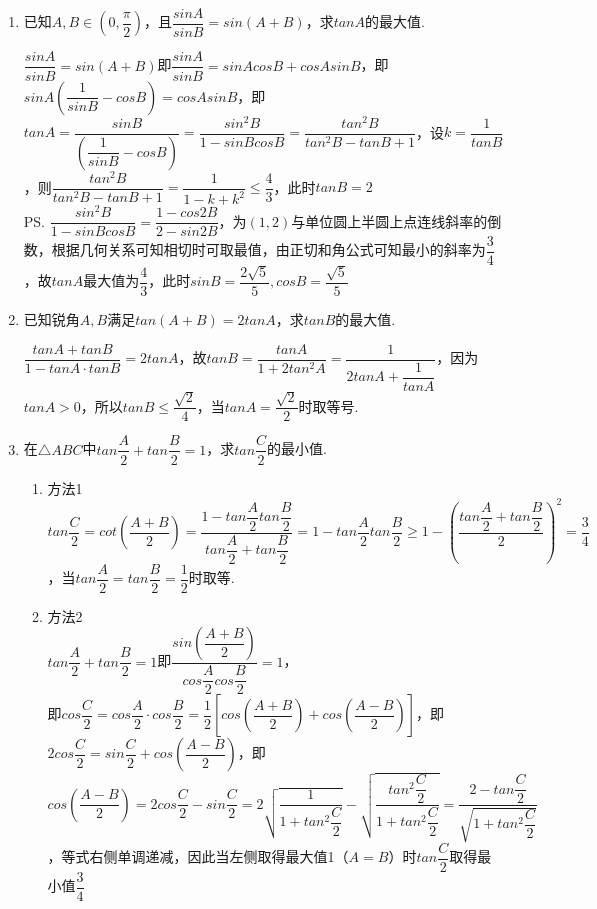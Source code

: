 \begin{enumerate}
    \item 已知$A, B \in \left(0, \dfrac{\pi}{2}\right)$，且$\dfrac{sinA}{sinB} = sin(A+B)$，求$tanA$的最大值.
    \begin{jieda}
        $\dfrac{sinA}{sinB} = sin(A+B)$即$\dfrac{sinA}{sinB} = sinAcosB+cosAsinB$，即$sinA\left(\dfrac{1}{sinB} - cosB\right) = cosAsinB$，即$tanA = \dfrac{sinB}{\left(\dfrac{1}{sinB} - cosB\right)} = \dfrac{sin^2B}{1 - sinBcosB} = \dfrac{tan^2B}{tan^2B - tanB + 1}$，设$k = \dfrac{1}{tanB}$，则$\dfrac{tan^2B}{tan^2B - tanB + 1} = \dfrac{1}{1 - k + k^2} \leq \dfrac{4}{3}$，此时$tanB = 2$ \\
        \ps $\dfrac{sin^2B}{1 - sinBcosB} = \dfrac{1-cos2B}{2-sin2B}$，为$(1, 2)$与单位圆上半圆上点连线斜率的倒数，根据几何关系可知相切时可取最值，由正切和角公式可知最小的斜率为$\dfrac{3}{4}$，故$tanA$最大值为$\dfrac{4}{3}$，此时$sinB = \dfrac{2\sqrt{5}}{5}, cosB = \dfrac{\sqrt{5}}{5}$
    \end{jieda}
    \item 已知锐角$A, B$满足$tan(A+B) = 2tanA$，求$tanB$的最大值.
    \begin{jieda}
        $\dfrac{tanA + tanB}{1-tanA \cdot tanB} = 2tanA$，故$tanB = \dfrac{tanA}{1+2tan^2A} = \dfrac{1}{2tanA + \dfrac{1}{tanA}}$，因为$tanA > 0$，所以$tanB \leq \dfrac{\sqrt{2}}{4}$，当$tanA = \dfrac{\sqrt{2}}{2}$时取等号.
    \end{jieda}
    \item 在$\triangle ABC$中$tan\dfrac{A}{2} + tan\dfrac{B}{2} = 1$，求$tan\dfrac{C}{2}$的最小值.
    \begin{jieda}
        \begin{enumerate}
            \item 方法1 \\
            $tan\dfrac{C}{2} = cot\left(\dfrac{A+B}{2}\right) = \dfrac{1-tan\dfrac{A}{2}tan\dfrac{B}{2}}{tan\dfrac{A}{2}+tan\dfrac{B}{2}} = 1-tan\dfrac{A}{2}tan\dfrac{B}{2} \geq 1 - \left(\dfrac{tan\dfrac{A}{2} + tan\dfrac{B}{2}}{2}\right)^2 = \dfrac{3}{4}$，当$tan\dfrac{A}{2} = tan\dfrac{B}{2} = \dfrac{1}{2}$时取等.
            \item 方法2 \\
            $tan\dfrac{A}{2} + tan\dfrac{B}{2} = 1$即$\dfrac{sin\left(\dfrac{A+B}{2}\right)}{cos\dfrac{A}{2}cos\dfrac{B}{2}} = 1$，\\
            即$cos\dfrac{C}{2} = cos\dfrac{A}{2}\cdot cos\dfrac{B}{2} = \dfrac{1}{2}\left[cos\left(\dfrac{A+B}{2}\right) + cos\left(\dfrac{A-B}{2}\right)\right]$，即$2cos\dfrac{C}{2} = sin\dfrac{C}{2}+cos\left(\dfrac{A-B}{2}\right)$，即$cos\left(\dfrac{A-B}{2}\right) = 2cos\dfrac{C}{2} - sin\dfrac{C}{2} = 2\sqrt{\dfrac{1}{1+tan^2\dfrac{C}{2}}} - \sqrt{\dfrac{tan^2\dfrac{C}{2}}{1+tan^2\dfrac{C}{2}}} = \dfrac{2 - tan\dfrac{C}{2}}{\sqrt{1+tan^2\dfrac{C}{2}}}$，等式右侧单调递减，因此当左侧取得最大值1（$A = B$）时$tan\dfrac{C}{2}$取得最小值$\dfrac{3}{4}$ \\

\end{enumerate}
\end{jieda}
\end{enumerate}
